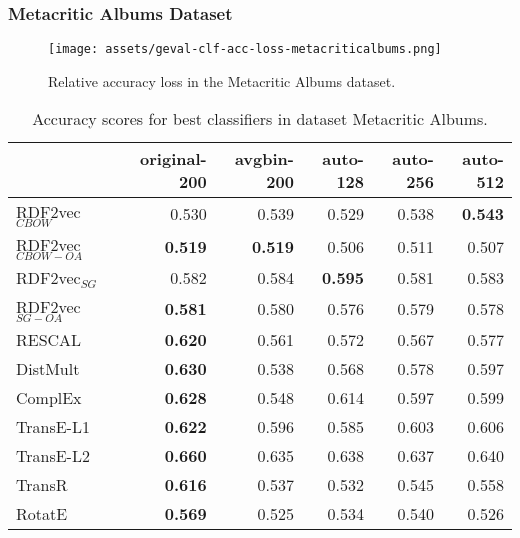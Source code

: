 \documentclass[11pt,titlepage,oneside,openany]{book}
\begin{document}
\newpage

\subsubsection{Metacritic Albums Dataset}
\label{subsubsec:geval-results-clf-metacriticalbums}


\begin{figure}[H]
    \centering
    \texttt{[image: assets/geval-clf-acc-loss-metacriticalbums.png]}
    \vspace*{-3mm}
    \caption{Relative accuracy loss in the Metacritic Albums dataset.}
    \label{fig:geval-clf-acc-loss-metacriticalbums}
\end{figure}


\begin{table}[H]
\centering
\begin{tabular}{lrrrrr}
\toprule
{} &  original-200 &  avgbin-200 &  auto-128 &  auto-256 &  auto-512 \\
\midrule
RDF2vec$_{CBOW}$     &         0.530  &       0.539  &     0.529  &     0.538  &	\textbf{0.543} \\
RDF2vec$_{CBOW-OA}$  &	\textbf{0.519} &	\textbf{0.519} &     0.506  &     0.511  &     0.507  \\
RDF2vec$_{SG}$       &         0.582  &       0.584  &	\textbf{0.595} &     0.581  &     0.583  \\
RDF2vec$_{SG-OA}$    &	\textbf{0.581} &       0.580  &     0.576  &     0.579  &     0.578  \\
RESCAL               &	\textbf{0.620} &       0.561  &     0.572  &     0.567  &     0.577  \\
DistMult             &	\textbf{0.630} &       0.538  &     0.568  &     0.578  &     0.597  \\
ComplEx              &	\textbf{0.628} &       0.548  &     0.614  &     0.597  &     0.599  \\
TransE-L1            &	\textbf{0.622} &       0.596  &     0.585  &     0.603  &     0.606  \\
TransE-L2            &	\textbf{0.660} &       0.635  &     0.638  &     0.637  &     0.640  \\
TransR               &	\textbf{0.616} &       0.537  &     0.532  &     0.545  &     0.558  \\
RotatE               &	\textbf{0.569} &       0.525  &     0.534  &     0.540  &     0.526  \\
\bottomrule
\end{tabular}
\caption{Accuracy scores for best classifiers in dataset Metacritic Albums.}
\label{tab:geval-clf-acc-metacriticalbums}
\end{table}
\end{document}
